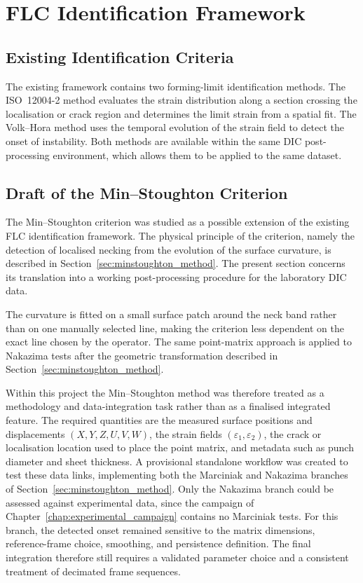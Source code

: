 \chapter{FLC Identification Framework}
\label{chap:identification_framework}

\section{Existing Identification Criteria}

The existing framework contains two forming-limit identification methods. The
ISO~12004-2 method evaluates the strain distribution along a section crossing
the localisation or crack region and determines the limit strain from a spatial
fit. The Volk--Hora method uses the temporal evolution of the strain field to
detect the onset of instability. Both methods are available within the same DIC
post-processing environment, which allows them to be applied to the same
dataset.

\section{Draft of the Min--Stoughton Criterion}
\label{sec:minstoughton_draft}

The Min--Stoughton criterion was studied as a possible extension of the
existing FLC identification framework. The physical principle of the criterion,
namely the detection of localised necking from the evolution of the surface
curvature, is described in Section~\ref{sec:minstoughton_method}. The present
section concerns its translation into a working post-processing procedure for
the laboratory DIC data.

The curvature is fitted on a small surface patch around the neck band rather
than on one manually selected line, making the criterion less dependent on
the exact line chosen by the operator. The same point-matrix approach is
applied to Nakazima tests after the geometric transformation described in
Section~\ref{sec:minstoughton_method}.

Within this project the Min--Stoughton method was therefore treated as a
methodology and data-integration task rather than as a finalised integrated
feature.
The required  quantities are the measured surface positions and
displacements $(X,Y,Z,U,V,W)$, the strain fields $(\varepsilon_1,
\varepsilon_2)$, the crack or localisation location used to place the point
matrix, and metadata such as punch diameter and sheet thickness. A provisional
standalone workflow was created to test these data links, implementing both
the Marciniak and Nakazima branches of Section~\ref{sec:minstoughton_method}.
Only the Nakazima branch could be assessed against experimental data, since
the campaign of Chapter~\ref{chap:experimental_campaign} contains no
Marciniak tests. For this branch, the detected onset remained sensitive to the
matrix dimensions, reference-frame choice, smoothing, and persistence
definition. The final integration therefore still requires a validated
parameter choice and a consistent treatment of decimated 
frame sequences.

